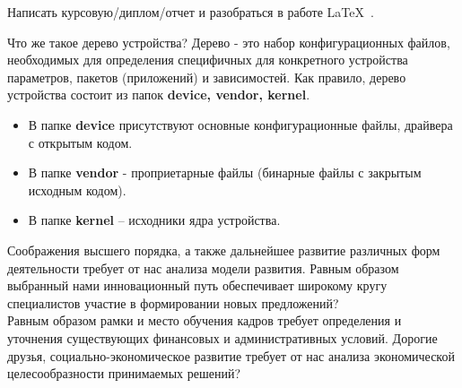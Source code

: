 \documentclass[14pt, a4paper]{extarticle}
\begin{document}



%






\newpage
\tableofcontents
\newpage




Написать курсовую/диплом/отчет и разобраться в работе \LaTeX\ .

Что же такое дерево устройства? Дерево - это набор конфигурационных
файлов, необходимых для определения специфичных для конкретного устройства параметров, пакетов (приложений) и зависимостей. Как правило, дерево устройства состоит из папок \textbf{device, vendor, kernel}.
\begin{itemize}
\item В папке \textbf{device} присутствуют основные конфигурационные файлы, драйвера с открытым кодом.
\item В папке \textbf{vendor} - проприетарные файлы (бинарные файлы с закрытым исходным кодом).
\item В папке \textbf{kernel} – исходники ядра устройства.
\end{itemize}



Соображения высшего порядка, а также дальнейшее развитие различных форм деятельности требует от нас анализа модели развития. Равным образом выбранный нами инновационный путь обеспечивает широкому кругу специалистов участие в формировании новых предложений?\\
Равным образом рамки и место обучения кадров требует определения и уточнения существующих финансовых и административных условий.
Дорогие друзья, социально-экономическое развитие требует от нас анализа экономической целесообразности принимаемых решений? \cite{kistyakovskii} %
\end{document}
